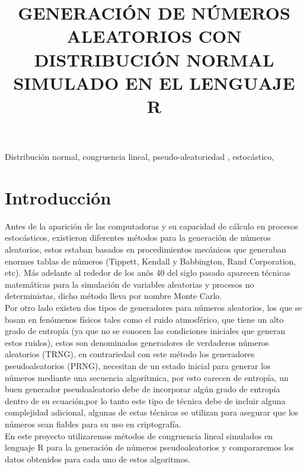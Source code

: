 \documentclass[conference,a4paper]{IEEEtran}
\begin{document}
	
\title{GENERACI\'ON DE N\'UMEROS ALEATORIOS CON DISTRIBUCI\'ON NORMAL SIMULADO EN EL LENGUAJE R}
\author{
}
\maketitle
	
\begin{abstract}

\end{abstract}
\begin{IEEEkeywords}
Distribuci\'on normal, congruencia lineal, pseudo-aleatoriedad , estoc\'astico, 
\end{IEEEkeywords}

\section{\textbf{Introducci\'on}}
Antes de la aparici\'on de las computadoras y su capacidad de c\'alculo en procesos estoc\'asticos, existieron diferentes m\'etodos para la generaci\'on de n\'umeros aleatorios, estos estaban basados en procedimientos mec\'anicos que generaban enormes tablas de n\'umeros (Tippett, Kendall y Babbington, Rand Corporation, etc). M\'as adelante al rededor de los an\~os 40 del siglo pasado aparecen t\'ecnicas matem\'aticas para la simulaci\'on de variables aleatorias y procesos no deterministas, dicho m\'etodo lleva por nombre Monte Carlo.\\
Por otro lado existen dos tipos de generadores para n\'umeros aleatorios, los que se basan en fen\'omenos f\'isicos tales como el ruido atmosf\'erico, que tiene un alto grado de entrop\'ia (ya que no se conocen las condiciones iniciales que generan estos ruidos), estos son denominados generadores de verdaderos n\'umeros aleatorios (TRNG), en contrariedad con este m\'etodo los generadores pseudoaleatorios (PRNG), necesitan de un estado inicial para generar los n\'umeros mediante una secuencia algor\'itmica, por esto carecen de entrop\'ia, un buen generador pseudoaleatorio debe de incorporar alg\'un grado de entrop\'ia dentro de su ecuaci\'on,por lo tanto este tipo de t\'ecnica debe de incluir alguna complejidad adicional, algunas de estas t\'ecnicas se utilizan para asegurar que los n\'umeros sean fiables para su uso en criptograf\'ia.\\
En este proyecto utilizaremos m\'etodos de congruencia lineal simulados en lenguaje R para la generaci\'on de n\'umeros pseudoaleatorios y compararemos los datos obtenidos para cada uno de estos algoritmos.
\end{document}
